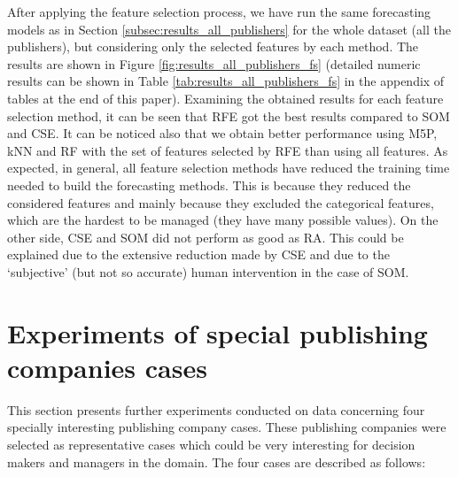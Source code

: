 \documentclass[a4paper,10pt,twocolumn,preprint,3p]{elsarticle}
\begin{document}
After applying the feature selection process, we have run the same
forecasting models as in Section \ref{subsec:results_all_publishers}
for the whole dataset (all the publishers), but considering only the
selected features by each method. 
The results are shown in Figure \ref{fig:results_all_publishers_fs} 
(detailed numeric results can be shown in Table \ref{tab:results_all_publishers_fs}
in the appendix of tables at the end of this paper).
Examining the obtained results for each feature selection method, 
it can be seen that RFE got the best results compared to SOM and CSE. 
It can be noticed also that we obtain better performance using M5P, 
kNN and RF with the set of features selected by RFE than using all features. 
As expected, in general, all feature selection methods have reduced the training 
time needed to build the forecasting methods. This is because they reduced the 
considered features and mainly because they excluded the categorical features, 
which are the hardest to be managed (they have many possible values). 
On the other side, CSE and SOM did not perform as good as RA. 
This could be explained due to the extensive reduction made by CSE and due to 
the `subjective' (but not so accurate) human intervention in the case of SOM. 



\section{Experiments of special publishing companies cases}
\label{sec:example_cases}

This section presents further experiments conducted on data concerning four 
specially interesting publishing company cases. These publishing companies were 
selected as representative cases which could be very interesting for decision 
makers and managers in the domain. The four cases are described as follows:
\end{document}
